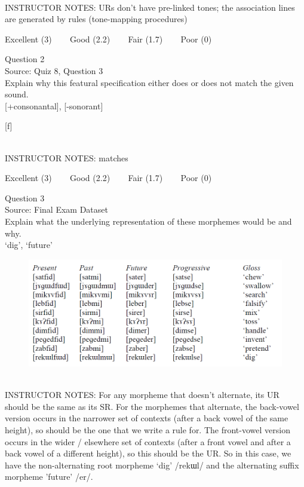 \documentclass[12pt]{article}
\begin{document}
~\\
INSTRUCTOR NOTES: URs don't have pre-linked tones; the association lines are generated by rules (tone-mapping procedures)


\vfill
Excellent (3) ~~~ Good (2.2) ~~~ Fair (1.7) ~~~ Poor (0)
\newpage

{\large Question 2}\\

Source: Quiz 8, Question 3\\

Explain why this featural specification either does or does not match the given sound.\\

{[+consonantal]}, {[-sonorant]}

{[f]}


~\\
INSTRUCTOR NOTES: matches


\vfill
Excellent (3) ~~~ Good (2.2) ~~~ Fair (1.7) ~~~ Poor (0)
\newpage

{\large Question 3}\\

Source: Final Exam Dataset\\

Explain what the underlying representation of these morphemes would be and why.\\

`dig', `future'

\begin{figure}[H]
\includegraphics{../images/final_dataset.png}
\end{figure}

~\\
INSTRUCTOR NOTES: For any morpheme that doesn’t alternate, its UR should be the same as its SR.  For the morphemes that alternate, the back-vowel version occurs in the narrower set of contexts (after a back vowel of the same height), so should be the one that we write a rule for. The front-vowel version occurs in the wider / elsewhere set of contexts (after a front vowel and after a back vowel of a different height), so this should be the UR. So in this case, we have the non-alternating root morpheme ‘dig’ /rekɯl/ and the alternating suffix morpheme 'future' /er/.
\end{document}
